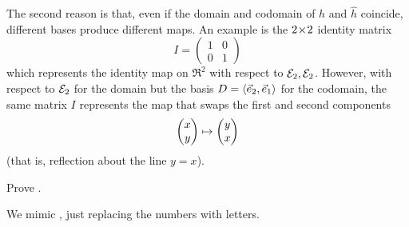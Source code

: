 \begin{exercises}
\begin{answer}
      The second reason is that, even if the domain and
      codomain of \( h \) and \( \hat{h} \) coincide, different bases produce
      different maps.
      An example is the $2 \! \times \! 2$ identity matrix
      \begin{equation*}
        I=\begin{pmatrix}
          1  &0  \\
          0  &1
        \end{pmatrix}
      \end{equation*}
      which represents the identity map on $\Re^2$ with respect to
      ${\cal E}_2,{\cal E}_2$.
      However, with respect to ${\cal E}_2$ for the domain but the basis 
      $D=\langle\vec{e}_2,\vec{e}_1\rangle$ for the codomain,
      the same matrix $I$ represents the map that swaps the first and second
      components 
      \begin{equation*}
        \begin{pmatrix} x \\ y \end{pmatrix}\mapsto\begin{pmatrix} y \\ x \end{pmatrix}
      \end{equation*}
      (that is, reflection about the line $y=x$).
    \end{answer}
  \item \label{exer:MatVecMultRepLinMap} 
    Prove .
    \begin{answer}
      We mimic , just replacing the 
      numbers with letters.


\end{answer}
\end{exercises}
